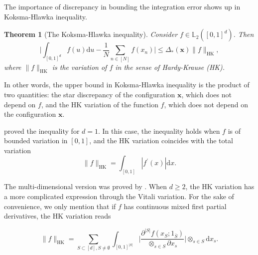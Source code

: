 \documentclass[twoside,11pt]{book}
\newtheorem{theorem}{Theorem}
\numberwithin{theorem}{chapter}
\numberwithin{definition}{chapter}
\numberwithin{proposition}{chapter}
\numberwithin{corollary}{chapter}
\numberwithin{example}{chapter}
\numberwithin{lemma}{chapter}
\numberwithin{assumption}{chapter}
\numberwithin{equation}{chapter}
\numberwithin{figure}{chapter}
\begin{document}

The importance of discrepancy in bounding the integration error shows up in Koksma-Hlawka inequality.


\begin{theorem}[The Koksma-Hlawka inequality]\label{thm:KH_ineq}
Consider $f \in \mathbb{L}_{2}([0,1]^{d})$. Then 
\begin{equation}\label{eq:KH_ineq}
\bigg| \int_{[0,1]^{d}} f(u) \mathrm{d}u - \frac{1}{N} \sum\limits_{n \in [N]}  f(x_{n})\bigg| \leq \Delta_{*}(\bm{x}) \|f\|_{\mathrm{HK}},
\end{equation}
where $\|f\|_{\mathrm{HK}}$ is the variation of $f$ in the sense of Hardy-Krause (HK). 


\end{theorem}

In other words, the upper bound in Koksma-Hlawka inequality is the product of two quantities: the star discrepancy of the configuration $\bm{x}$, which does not depend on $f$, and the HK variation of the function $f$, which does not depend on the configuration $\bm{x}$. 

\cite{Kok42} proved the inequality for $d=1$. In this case, the inequality holds when $f$ is of bounded variation in $[0,1]$, and the HK variation coincides with the total variation
\begin{equation}
\|f\|_{\mathrm{HK}} = \int_{[0,1]}|f^{'}(x)| \mathrm{d}x.
\end{equation}


The multi-dimensional version was proved by \cite{Hla61}. When $d \geq 2$, the HK variation has a more complicated expression through the Vitali variation. For the sake of convenience, we only mention that if $f$ has continuous mixed first partial derivatives, the HK variation reads

\begin{equation}
\|f\|_{\mathrm{HK}} = \sum\limits_{S \subset[d], S \neq \emptyset} \int_{[0,1]^{|S|}} \bigg|\frac{\partial^{|S|} f (x_S;1_{\bar{S}})}{\otimes_{s \in S}\partial x_{s}} \bigg| \otimes_{s \in S}\mathrm{d} x_{s}.
\end{equation}
\end{document}
